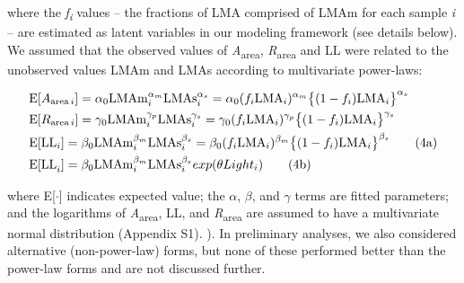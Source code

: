 \documentclass[
  12pt,
  a4paper,
,tablecaptionabove
]{scrartcl}
\begin{document}
where the \emph{f\textsubscript{i}} values -- the fractions of LMA
comprised of LMAm for each sample \emph{i} -- are estimated as latent
variables in our modeling framework (see details below). We assumed that
the observed values of \emph{A}\textsubscript{area},
\emph{R}\textsubscript{area} and LL were related to the unobserved
values LMAm and LMAs according to multivariate power-laws:

\begin{align}
& \mathrm{E}[A_{\mathrm{area} \, i}]
= \alpha_0\mathrm{LMAm}_{i}^{\alpha_m}\mathrm{LMAs}_i^{\alpha_s}  =  \alpha_0 (f_i \mathrm{LMA}_{i})^{\alpha_m} \bigl\{(1-f_i) \mathrm{LMA}_{i}\bigr\}^{\alpha_s} \label{eq:Aarea} \\
& \mathrm{E}[R_{\mathrm{area} \, i}]
= \gamma_0\mathrm{LMAm}_{i}^{\gamma_p} \mathrm{LMAs}_{i}^{\gamma_s}
= \gamma_0 (f_i \mathrm{LMA}_{i})^{\gamma_p} \bigl\{(1-f_i)\mathrm{LMA}_{i}\bigr\}^{\gamma_s} \label{eq:Rarea} \\
& \mathrm{E}[\mathrm{LL}_i] = \beta_0\mathrm{LMAm}_{i}^{\beta_m} \mathrm{LMAs}_{i}^{\beta_s}  = \beta_0 (f_i \mathrm{LMA}_{i})^{\beta_m} \bigl\{(1-f_i) \mathrm{LMA}_{i}\bigr\}^{\beta_s} \label{eq:LL_pot} \tag{4a}  \\
& \mathrm{E[LL}_i] = \beta_0\mathrm{LMAm}_{i}^{\beta_m} \mathrm{LMAs}_{i}^{\beta_s} exp(\theta Light_i)  \stepcounter{equation} \label{eq:LL_opt} \tag{4b}
\end{align}

where E{[}\(\cdot\){]} indicates expected value; the \(\alpha\),
\(\beta\), and \(\gamma\) terms are fitted parameters; and the
logarithms of \emph{A}\textsubscript{area}, LL, and
\emph{R}\textsubscript{area} are assumed to have a multivariate normal
distribution (Appendix S1). ). In preliminary analyses, we also
considered alternative (non-power-law) forms, but none of these
performed better than the power-law forms and are not discussed further.
\end{document}
